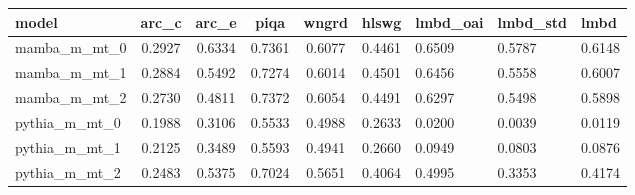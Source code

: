 \begin{tabular}{lccccc}
\toprule
model & arc\_c & arc\_e & piqa & wngrd & hlswg & lmbd\_oai & lmbd\_std & lmbd \\
\midrule
mamba\_m\_mt\_0 & 0.2927 & 0.6334 & 0.7361 & 0.6077 & 0.4461 & 0.6509 & 0.5787 & 0.6148 \\
mamba\_m\_mt\_1 & 0.2884 & 0.5492 & 0.7274 & 0.6014 & 0.4501 & 0.6456 & 0.5558 & 0.6007 \\
mamba\_m\_mt\_2 & 0.2730 & 0.4811 & 0.7372 & 0.6054 & 0.4491 & 0.6297 & 0.5498 & 0.5898 \\
pythia\_m\_mt\_0 & 0.1988 & 0.3106 & 0.5533 & 0.4988 & 0.2633 & 0.0200 & 0.0039 & 0.0119 \\
pythia\_m\_mt\_1 & 0.2125 & 0.3489 & 0.5593 & 0.4941 & 0.2660 & 0.0949 & 0.0803 & 0.0876 \\
pythia\_m\_mt\_2 & 0.2483 & 0.5375 & 0.7024 & 0.5651 & 0.4064 & 0.4995 & 0.3353 & 0.4174 \\
\bottomrule
\end{tabular}
